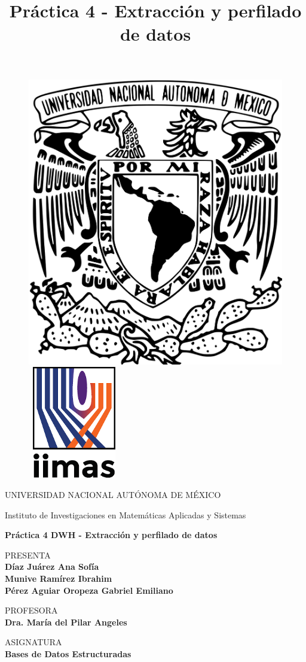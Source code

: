 
\title{Práctica 4 - Extracción y perfilado de datos}

\thispagestyle{empty}

\begin{figure}[ht]
	\includegraphics[width = 4.6 cm]{logo_unam.png}
	\endminipage
	\includegraphics[height = 4.9cm, width = 4cm]{logo_iimas.png}
	\endminipage 
\end{figure}

\begin{center}
	\vspace{0.5cm}
	\LARGE
	UNIVERSIDAD NACIONAL AUTÓNOMA DE MÉXICO

	\vspace{0.5cm}
	\LARGE
	Instituto de Investigaciones en Matemáticas Aplicadas y Sistemas

	\vspace{1.5cm}
	\Large
	\textbf{Práctica 4 DWH - Extracción y perfilado de datos}

	\vspace{1cm}
	\normalsize
	PRESENTA \\
	\vspace{.3cm}
	\large
	\textbf{Díaz Juárez Ana Sofía \\}
	\textbf{Munive Ramírez Ibrahim \\}
	\textbf{Pérez Aguiar Oropeza Gabriel Emiliano \\}


	\vspace{1cm}
	\normalsize
	PROFESORA \\
	\vspace{.3cm}
	\large
	\textbf{Dra. María del Pilar Angeles}

	\vspace{1cm}
	\normalsize
	ASIGNATURA \\
	\vspace{.3cm}
	\large
	\textbf{Bases de Datos Estructuradas}

	\vspace{1cm}
\end{center}

\newpage
